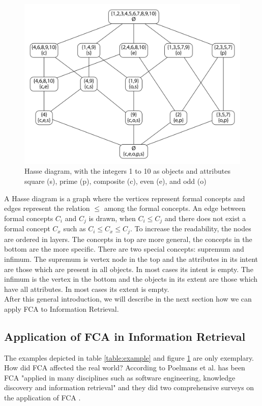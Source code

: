 \documentclass[11pt]{report}
\begin{document}
\begin{figure}[h]
	\centering
	\includegraphics[width=\linewidth]{./images/fcaExample}
\caption{Hasse diagram, with the integers 1 to 10 as objects and attributes square (s), prime (p), composite (c), even (e), and odd (o)}
\label{figure:example}
\end{figure}

A Hasse diagram is a graph where the vertices represent formal concepts and edges represent the relation $\le$ among the formal concepts. An edge between formal concepts $C_i$ and $C_j$ is drawn, when $C_i \le C_j$ and there does not exist a formal concept $C_x$ such as $C_i \le C_x \le C_j$. To increase the readability, the nodes are ordered in layers. The concepts in top are more general, the concepts in the bottom are the more specific. There are two special concepts: supremum and infimum. The supremum is vertex node in the top and the attributes in its intent are those which are present in all objects. In most cases its intent is empty. The infimum is the vertex in the bottom and the objects in its extent are those which have all attributes. In most cases its extent is empty.\\

After this general introduction, we will describe in the next section how we can apply FCA to Information Retrieval.

\subsection{Application of FCA in Information Retrieval}

The examples depicted in table \ref{table:example} and figure \ref{figure:example} are only exemplary. How did FCA affected the real world? According to Poelmans et al. has been FCA "applied in many disciplines such as software engineering, knowledge discovery and information retrieval" \cite{Poelmans2013} and they did two comprehensive surveys on the application of FCA \cite{Poelmans2013, Poelmans2013b}. \\
\end{document}

